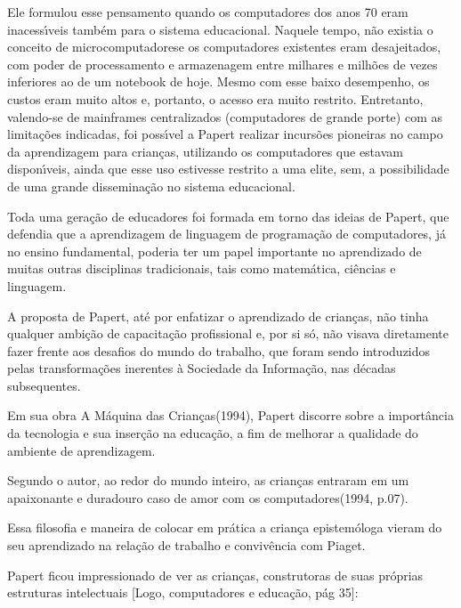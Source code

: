 \documentclass[
12pt,		%
openright,	%
twoside,  %
a4paper,			%
chapter=TITLE,		%
english,			%
french,				%
spanish,			%
brazil				%
]{USPSC-classe/USPSC}
\begin{document}
Ele formulou esse pensamento quando os computadores dos anos 70 eram inacess\'{\i}veis tamb\'em para o sistema educacional. Naquele tempo, n\~ao existia o conceito de \textquotedbl microcomputadores\textquotedbl  e os computadores existentes eram desajeitados, com poder de processamento e armazenagem entre milhares e milh\~oes de vezes inferiores ao de um notebook de hoje. Mesmo com esse baixo desempenho, os custos eram muito altos e, portanto, o acesso era muito restrito. Entretanto, valendo-se de mainframes centralizados (computadores de grande porte) com as limita\c{c}\~oes indicadas, foi poss\'{\i}vel a Papert realizar incurs\~oes pioneiras no campo da aprendizagem para crian\c{c}as, utilizando os computadores que estavam dispon\'{\i}veis, ainda que esse uso estivesse restrito a uma elite, sem, a possibilidade de uma grande dissemina\c{c}\~ao no sistema educacional.


Toda uma gera\c{c}\~ao de educadores foi formada em torno das ideias de Papert, que defendia que a aprendizagem de linguagem de programa\c{c}\~ao de computadores, j\'a no ensino fundamental, poderia ter um papel importante no aprendizado de muitas outras disciplinas tradicionais, tais como matem\'atica, ci\^encias e linguagem.


A proposta de Papert, at\'e por enfatizar o aprendizado de crian\c{c}as, n\~ao tinha qualquer ambi\c{c}\~ao de capacita\c{c}\~ao profissional e, por si s\'o, n\~ao visava diretamente fazer frente aos desafios do \textquotedbl mundo do trabalho\textquotedbl , que foram sendo introduzidos pelas transforma\c{c}\~oes inerentes \`a Sociedade da Informa\c{c}\~ao, nas d\'ecadas subsequentes.


Em sua obra \textquotedbl A M\'aquina das Crian\c{c}as\textquotedbl  (1994), Papert discorre sobre a import\^ancia da tecnologia e sua inser\c{c}\~ao na educa\c{c}\~ao, a fim de melhorar a qualidade do ambiente de aprendizagem.


Segundo o autor, \textquotedbl ao redor do mundo inteiro, as crian\c{c}as entraram em um apaixonante e duradouro caso de amor com os computadores\textquotedbl  (1994, p.07).


Essa filosofia e maneira de colocar em pr\'atica a crian\c{c}a epistem\'ologa vieram do seu aprendizado na rela\c{c}\~ao de trabalho e conviv\^encia com Piaget.


Papert ficou impressionado de ver as crian\c{c}as, construtoras de suas pr\'oprias estruturas intelectuais [Logo, computadores e educa\c{c}\~ao, p\'ag 35]:
\end{document}
